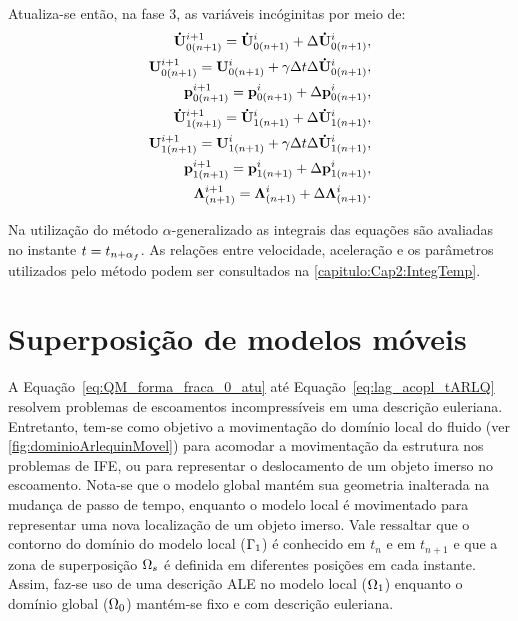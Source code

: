 Atualiza-se então, na fase 3, as variáveis incóginitas por meio de:
\begin{align}
	\mathbf{\dot{U}}_{0(n+1)}^{i+1} = \mathbf{\dot{U}}_{0(n+1)}^{i} + \Delta\mathbf{\dot{U}}_{0(n+1)}^{i}, \label{eq:atu_acel_0} \\ 
	\mathbf{U}_{0(n+1)}^{i+1} = \mathbf{U}_{0(n+1)}^{i} + \gamma \Delta t \Delta\mathbf{\dot{U}}_{0(n+1)}^{i},\label{eq:atu_vel_0}\\
	\mathbf{p}_{0(n+1)}^{i+1} = \mathbf{p}_{0(n+1)}^{i} + \Delta\mathbf{p}_{0(n+1)}^{i}, \label{eq:atu_press_0} \\
	\mathbf{\dot{U}}_{1(n+1)}^{i+1} = \mathbf{\dot{U}}_{1(n+1)}^{i} + \Delta\mathbf{\dot{U}}_{1(n+1)}^{i}, \label{eq:atu_acel_1} \\ 
	\mathbf{U}_{1(n+1)}^{i+1} = \mathbf{U}_{1(n+1)}^{i} + \gamma \Delta t \Delta\mathbf{\dot{U}}_{1(n+1)}^{i},\label{eq:atu_vel_1}\\
	\mathbf{p}_{1(n+1)}^{i+1} = \mathbf{p}_{1(n+1)}^{i} + \Delta\mathbf{p}_{1(n+1)}^{i}, \label{eq:atu_press_1} \\
	\boldsymbol{\Lambda}_{(n+1)}^{i+1} = \boldsymbol{\Lambda}_{(n+1)}^{i} + \Delta\boldsymbol{\Lambda}_{(n+1)}^{i}. \label{eq:atu_lag_mult}
\end{align}

Na utilização do método $\alpha$-generalizado as integrais das equações são avaliadas no instante $t = t_{n+\alpha_f}$. As relações entre velocidade, aceleração e os parâmetros utilizados pelo método podem ser consultados na \autoref{capitulo:Cap2:IntegTemp}.

\section{Superposição de modelos móveis}

A Equação~\eqref{eq:QM_forma_fraca_0_atu} até Equação~\eqref{eq:lag_acopl_tARLQ} resolvem problemas de escoamentos incompressíveis em uma descrição euleriana. Entretanto, tem-se como objetivo a movimentação do domínio local do fluido (ver \autoref{fig:dominioArlequinMovel}) para acomodar a movimentação da estrutura nos problemas de IFE, ou para representar o deslocamento de um objeto imerso no escoamento.  Nota-se que o modelo global mantém sua geometria inalterada na mudança de passo de tempo, enquanto o modelo local é movimentado para representar uma nova localização de um objeto imerso. Vale ressaltar que o contorno do domínio do modelo local ($\Gamma_1$) é conhecido em $t_n$ e em $t_{n+1}$ e que a zona de superposição $\Omega_s$ é definida em diferentes posições em cada instante. Assim, faz-se uso de uma descrição ALE no modelo local ($\Omega_1$) enquanto o domínio global ($\Omega_0$) mantém-se fixo e com descrição euleriana. 


